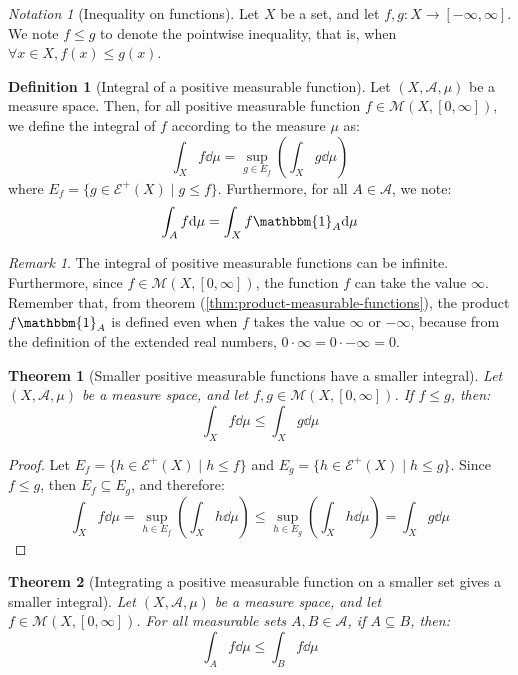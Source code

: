 \documentclass{article}
\newtheorem{theorem}{Theorem}[section]
\theoremstyle{definition}
\newtheorem{definition}{Definition}[section]
\theoremstyle{remark}
\newtheorem*{remark}{Remark}
\theoremstyle{example}
\theoremstyle{notation}
\newtheorem{notation}{Notation}[section]
\theoremstyle{axiom}
\begin{document}
\begin{notation}[Inequality on functions]
		Let $X$ be a set, and let $f, g : X \rightarrow [-\infty, \infty]$. We note $f \leq g$ to denote the pointwise inequality, that is, when $\forall x \in X, f(x) \leq g(x)$.
\end{notation}

\begin{definition}[Integral of a positive measurable function] %
		Let $(X, \mathcal{A}, \mu)$ be a measure space. Then, for all positive measurable function $f \in \mathcal{M}(X, [0, \infty])$, we define the integral of $f$ according to the measure $\mu$ as:
				$$\int_X f \dd \mu = \sup_{g \in E_f} \left(\int_X g \dd \mu\right)$$
		where $E_f = \{g \in \mathcal{E}^+(X) \mid g \leq f\}$. Furthermore, for all $A \in \mathcal{A}$, we note:
				$$\int_A f \dd \mu = \int_X f \mathbbm{1}_A \dd \mu$$
\end{definition}

\begin{remark}
		The integral of positive measurable functions can be infinite. Furthermore, since $f \in \mathcal{M}(X, [0, \infty])$, the function $f$ can take the value $\infty$. Remember that, from theorem (\ref{thm:product-measurable-functions}), the product $f \mathbbm{1}_A$ is defined even when $f$ takes the value $\infty$ or $-\infty$, because from the definition of the extended real numbers, $0 \cdot \infty = 0 \cdot -\infty = 0$.
\end{remark}

\begin{theorem}[Smaller positive measurable functions have a smaller integral] \label{thm:smaller-positive-measurable-functions-smaller-integral} %
		Let $(X, \mathcal{A}, \mu)$ be a measure space, and let $f, g \in \mathcal{M}(X, [0, \infty])$. If $f \leq g$, then:
				$$\int_X f \dd \mu \leq \int_X g \dd \mu$$
\end{theorem}

\begin{proof}
		Let $E_f = \{h \in \mathcal{E}^+(X) \mid h \leq f\}$ and $E_g = \{h \in \mathcal{E}^+(X) \mid h \leq g\}$. Since $f \leq g$, then $E_f \subseteq E_g$, and therefore:
		$$\int_X f \dd \mu = \sup_{h \in E_f} \left(\int_X h \dd \mu\right) \leq \sup_{h \in E_g} \left(\int_X h \dd \mu\right) = \int_X g \dd \mu$$
\end{proof}

\begin{theorem}[Integrating a positive measurable function on a smaller set gives a smaller integral] %
		Let $(X, \mathcal{A}, \mu)$ be a measure space, and let $f \in \mathcal{M}(X, [0, \infty])$. For all measurable sets $A, B \in \mathcal{A}$, if $A \subseteq B$, then:
				$$\int_A f \dd \mu \leq \int_B f \dd \mu$$
\end{theorem}
\end{document}
